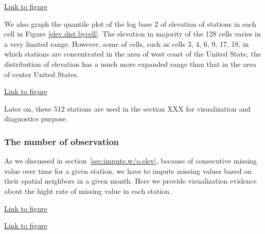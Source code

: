 \begin{framed}
\begin{center}
  \href{../plots/vertices.a1950.pdf}{Link to figure}
  \label{a1950.vertices}
\end{center}
\end{framed}

We also graph the quantile plot of the log base 2 of elevation of stations in each
cell in Figure \href{../plots/elev.dist.bycell.pdf}{\ref*{elev.dist.bycell}}. 
The elevation in majority of the 128 cells varies in a very limited range. However, 
some of cells, such as cells 3, 4, 6, 9, 17, 18, in which stations are 
concentrated in the area of west coast of the United State, the distribution of 
elevation has a much more expanded range than that in the area of center United 
States. 

\begin{framed}
\begin{center}
  \href{../plots/elev.dist.bycell.pdf}{Link to figure}
  \label{elev.dist.bycell}
\end{center}
\end{framed}

Later on, these 512 stations are used in the section XXX for visualization and 
diagnostics purpose.

\subsubsection{The number of observation}

As we discussed in section~\ref{sec:impute.w/o.elev}, because of consecutive 
missing value over time for a given station, we have to impute missing values 
based on their spatial neighbors in a given month. Here we provide visualization
evidence about the hight rate of missing value in each station.

\begin{framed}
\begin{center}
  \href{../plots/a1950/a1950.obs.station.pdf}{Link to figure}
  \label{quant.obs}
\end{center}
\end{framed}

\begin{framed}
\begin{center}
  \href{../plots/a1950/a1950.obsrate.station.pdf}{Link to figure}
  \label{quant.obsrate}
\end{center}
\end{framed}

